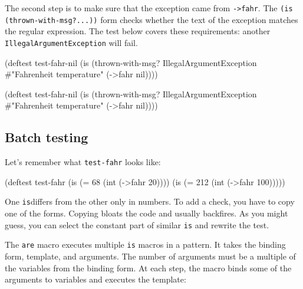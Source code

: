 \fi

The second step is to make sure that the exception came from \verb|->fahr|. The \texttt{(is (thrown\--with-msg?...))} form checks whether the text of the exception matches the regular expression. The test below covers these requirements: another \verb|IllegalArgumentException| will fail.

\ifnarrow

\begin{english}
  \begin{clojure}
(deftest test-fahr-nil
  (is (thrown-with-msg?
       IllegalArgumentException
       #"Fahrenheit temperature"
       (->fahr nil))))
  \end{clojure}
\end{english}

\else

\begin{english}
  \begin{clojure}
(deftest test-fahr-nil
  (is (thrown-with-msg?
       IllegalArgumentException #"Fahrenheit temperature"
       (->fahr nil))))
  \end{clojure}
\end{english}

\fi

\subsection{Batch testing}

Let's remember what \verb|test-fahr| looks like:

\begin{english}
  \begin{clojure}
(deftest test-fahr
  (is (= 68 (int (->fahr 20))))
  (is (= 212 (int (->fahr 100)))))
  \end{clojure}
\end{english}

One \verb|is|differs from the other only in numbers. To add a check, you have to copy one of the forms. Copying bloats the code and usually backfires. As you might guess, you can select the constant part of similar \verb|is| and rewrite the test.


The \verb|are| macro executes multiple \verb|is| macros in a pattern. It takes the binding form, template, and arguments. The number of arguments must be a multiple of the variables from the binding form. At each step, the macro binds some of the arguments to variables and executes the template:

